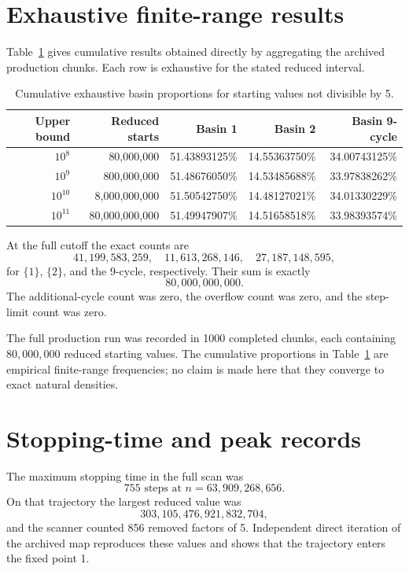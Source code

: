 \documentclass[11pt]{article}
\begin{document}
\section{Exhaustive finite-range results}
Table~\ref{tab:cutoffs} gives cumulative results obtained directly by aggregating the archived production chunks. Each row is exhaustive for the stated reduced interval.

\begin{table}[ht]
\centering
\small
\begin{tabular}{r r r r r}
\toprule
Upper bound & Reduced starts & Basin 1 & Basin 2 & Basin 9-cycle\\
\midrule
$10^8$  & 80,000,000 & 51.43893125\% & 14.55363750\% & 34.00743125\%\\
$10^9$  & 800,000,000 & 51.48676050\% & 14.53485688\% & 33.97838262\%\\
$10^{10}$ & 8,000,000,000 & 51.50542750\% & 14.48127021\% & 34.01330229\%\\
$10^{11}$ & 80,000,000,000 & 51.49947907\% & 14.51658518\% & 33.98393574\%\\
\bottomrule
\end{tabular}
\caption{Cumulative exhaustive basin proportions for starting values not divisible by 5.}
\label{tab:cutoffs}
\end{table}

At the full cutoff the exact counts are
\[
41{,}199{,}583{,}259,
\quad 11{,}613{,}268{,}146,
\quad 27{,}187{,}148{,}595,
\]
for $\{1\}$, $\{2\}$, and the 9-cycle, respectively. Their sum is exactly
\[
80{,}000{,}000{,}000.
\]
The additional-cycle count was zero, the overflow count was zero, and the step-limit count was zero.

The full production run was recorded in 1000 completed chunks, each containing $80{,}000{,}000$ reduced starting values. The cumulative proportions in Table~\ref{tab:cutoffs} are empirical finite-range frequencies; no claim is made here that they converge to exact natural densities.

\section{Stopping-time and peak records}
The maximum stopping time in the full scan was
\[
\boxed{755\text{ steps at }n=63{,}909{,}268{,}656}.
\]
On that trajectory the largest reduced value was
\[
303{,}105{,}476{,}921{,}832{,}704,
\]
and the scanner counted 856 removed factors of 5. Independent direct iteration of the archived map reproduces these values and shows that the trajectory enters the fixed point 1.
\end{document}
